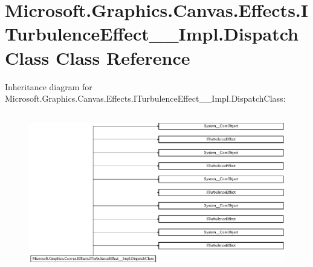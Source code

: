 \hypertarget{class_microsoft_1_1_graphics_1_1_canvas_1_1_effects_1_1_i_turbulence_effect_____impl_1_1_dispatch_class}{}\section{Microsoft.\+Graphics.\+Canvas.\+Effects.\+I\+Turbulence\+Effect\+\_\+\+\_\+\+Impl.\+Dispatch\+Class Class Reference}
\label{class_microsoft_1_1_graphics_1_1_canvas_1_1_effects_1_1_i_turbulence_effect_____impl_1_1_dispatch_class}
Inheritance diagram for Microsoft.\+Graphics.\+Canvas.\+Effects.\+I\+Turbulence\+Effect\+\_\+\+\_\+\+Impl.\+Dispatch\+Class\+:\begin{figure}[H]
\begin{center}
\leavevmode
\includegraphics[height=6.968326cm]{class_microsoft_1_1_graphics_1_1_canvas_1_1_effects_1_1_i_turbulence_effect_____impl_1_1_dispatch_class}
\end{center}
\end{figure}
